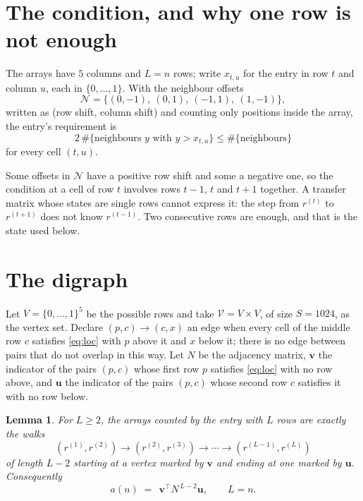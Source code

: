 \documentclass[11pt,a4paper]{article}
\theoremstyle{plain}
\newtheorem{lemma}[theorem]{Lemma}
\theoremstyle{definition}
\begin{document}
\section{The condition, and why one row is not enough}

The arrays have $5$ columns and $L=n$ rows; write $x_{t,u}$ for the entry in
row $t$ and column $u$, each in $\{0,\dots,1\}$. With the neighbour offsets
\[
\mathcal N=\{(0,-1),\ (0,1),\ (-1,1),\ (1,-1)\},
\]
written as (row shift, column shift) and counting only positions inside the array, the
entry's requirement is
\begin{equation}\label{eq:loc}
2\,\#\{\text{neighbours }y\text{ with }y>x_{t,u}\}\le\#\{\text{neighbours}\}
\end{equation}
for every cell $(t,u)$.

Some offsets in $\mathcal N$ have a positive row shift and some a negative one, so the
condition at a cell of row $t$ involves rows $t-1$, $t$ and $t+1$ together. A transfer
matrix whose states are single rows cannot express it: the step from $r^{(t)}$ to
$r^{(t+1)}$ does not know $r^{(t-1)}$. Two consecutive rows are enough, and that is
the state used below.

\section{The digraph}

Let $V=\{0,\dots,1\}^{5}$ be the possible rows and take
$\mathcal V=V\times V$, of size $S=1024$, as the vertex set. Declare $(p,c)\to(c,x)$ an edge
when every cell of the middle row $c$ satisfies \eqref{eq:loc} with $p$ above it and $x$
below it; there is no edge between pairs that do not overlap in this way. Let $N$ be the
adjacency matrix, $\mathbf{v}$ the indicator of the pairs $(p,c)$ whose first row $p$
satisfies \eqref{eq:loc} with no row above, and $\mathbf{u}$ the indicator of
the pairs $(p,c)$ whose second row $c$ satisfies it with no row below.

\begin{lemma}\label{lem:walk}
For $L\ge2$, the arrays counted by the entry with $L$ rows are exactly the walks
\[
(r^{(1)},r^{(2)})\to(r^{(2)},r^{(3)})\to\cdots\to(r^{(L-1)},r^{(L)})
\]
of length $L-2$ starting at a vertex marked by $\mathbf{v}$ and ending at one marked by
$\mathbf{u}$. Consequently
\[
a(n)\;=\;\,\mathbf{v}^{\!\top}N^{\,L-2}\mathbf{u},\qquad L=n .
\]
\end{lemma}
\end{document}

